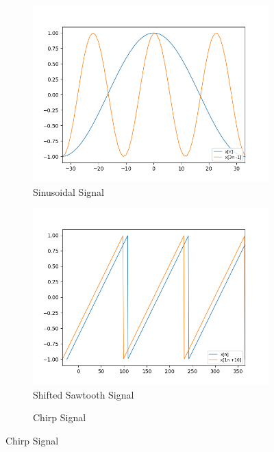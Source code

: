 \documentclass[10pt,a4paper, margin=1in]{article}
\begin{document}
\begin{figure}[H]
    \centering
    \begin{subfigure}[t]{0.3\linewidth}
        \centering
        \caption{Sinusoidal Signal}
        \includegraphics[width=1\linewidth]{assets/q7b/sine_part_b.png}
    \end{subfigure}
    \begin{subfigure}[t]{0.3\linewidth}
        \centering
        \caption{Shifted Sawtooth Signal}
        \includegraphics[width=1\linewidth]{assets/q7b/shifted_sawtooth_part_b.png}
    \end{subfigure}
    \begin{subfigure}[t]{0.3\linewidth}
        \centering
        \caption{Chirp Signal}

\end{subfigure}
\end{figure}
\end{document}
